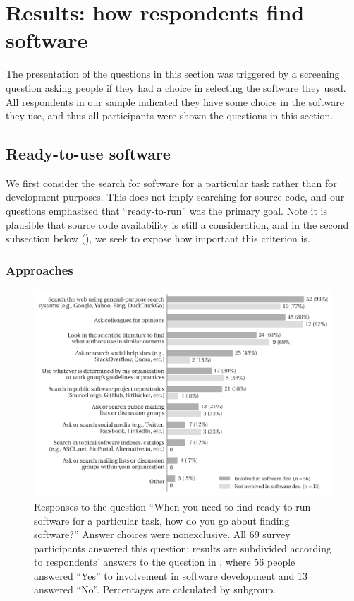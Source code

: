 \documentclass{casicswhitepaper}
\newcommand{\totalRespondents}{69\xspace}
\newcommand{\totalDevelopers}{56\xspace}
\begin{document}
\section{Results: how respondents find software}

The presentation of the questions in this section was triggered by a screening question asking people if they had a choice in selecting the software they used.  All respondents in our sample indicated they have some choice in the software they use, and thus all participants were shown the questions in this section.


\subsection{Ready-to-use software}
 
We first consider the search for software for a particular task rather than for development purposes. This does not imply searching for source code, and our questions emphasized that ``ready-to-run'' was the primary goal.  Note it is plausible that source code availability is still a consideration, and in the second subsection below (), we seek to expose how important this criterion is.

 
\subsubsection{Approaches}
\label{approaches-ready-to-use}

\begin{figure}[b]
  \vspace*{-1ex}
  \centering
  \includegraphics{files/plots/how-find-ready-to-run-v4.pdf}
  \vspace*{-4ex}
  \caption{Responses to the question ``When you need to find ready-to-run software for a particular task, how do you go about finding software?'' Answer choices were nonexclusive.  All \totalRespondents survey participants answered this question; results are subdivided according to respondents' answers to the question in , where \totalDevelopers people answered ``Yes'' to involvement in software development and 13 answered ``No''.  Percentages are calculated by subgroup.}
  \label{how-find-ready-to-run}
\end{figure}
\end{document}
